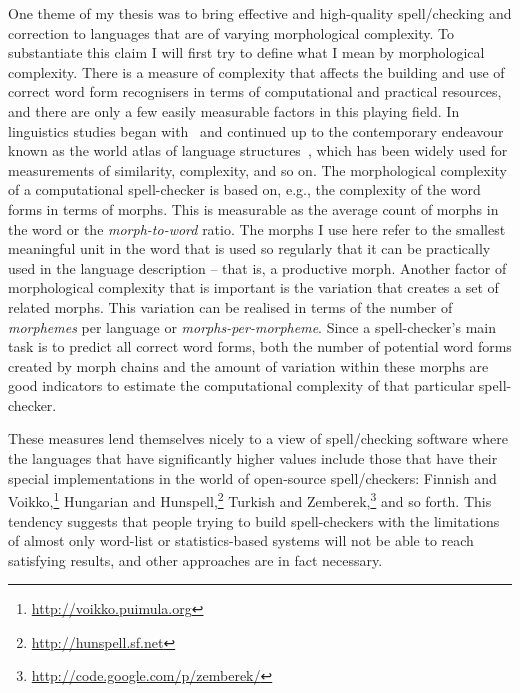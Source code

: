 \documentclass[officiallayout,final]{unihelcompling}
\begin{document}
One theme of my thesis was to bring effective and high-quality spell\-/checking
and correction to languages that are of varying \gls{morphological complexity}.
To substantiate this claim I will first try to define what I mean by
morphological complexity. There is a measure of complexity that affects the
building and use of correct word form recognisers in terms of computational and
practical resources, and there are only a few easily measurable factors in this
playing field. In linguistics studies began
with~\citet{greenberg1960quantitative} and continued up to the contemporary
endeavour known as the world atlas of language structures~\citep{wals}, which
has been widely used for measurements of similarity, complexity, and so on.
The morphological complexity of a computational spell-checker is based on,
e.g., the complexity of the word forms in terms of \glspl{morph}.  This is
measurable as the average count of morphs in the word or the
\emph{morph-to-word} ratio. The morphs I use here refer to the smallest
meaningful unit in the word that is used so regularly that it can be
practically used in the language description -- that is, a productive morph.
Another factor of morphological complexity that is important is the variation
that creates a set of related morphs. This variation can be realised in terms
of the number of \emph{morphemes} per language or \emph{morphs-per-morpheme}.
Since a spell-checker's main task is to predict all correct word forms, both
the number of potential word forms created by morph chains and the amount of
variation within these morphs are good indicators to estimate the computational
complexity of that particular spell-checker.

These measures lend themselves nicely to a view of spell\-/checking
software where the languages that have significantly higher values 
include those that have their special implementations in the
world of open-source spell\-/checkers: Finnish and
Voikko,\footnote{\url{http://voikko.puimula.org}} Hungarian and
Hunspell,\footnote{\url{http://hunspell.sf.net}} Turkish and
Zemberek,\footnote{\url{http://code.google.com/p/zemberek/}} and so forth.
This tendency suggests that people trying to build spell-checkers with the
limitations of almost only word-list or statistics-based systems will not be
able to reach satisfying results, and other approaches are in fact necessary.
\end{document}
